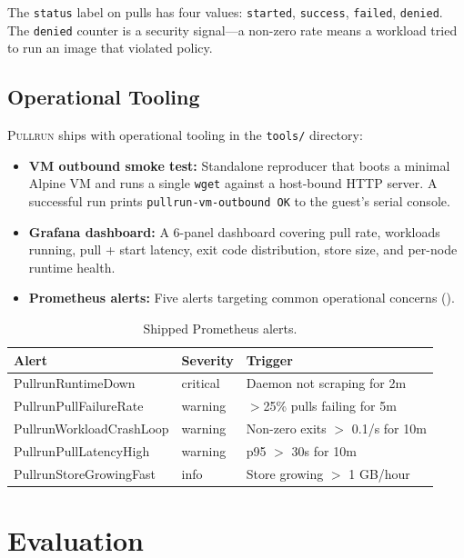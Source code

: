 \documentclass[11pt,a4paper]{article}
\newcommand{\pullrun}{\textsc{Pullrun}}
\begin{document}
The \texttt{status} label on pulls has four values: \texttt{started}, \texttt{success}, \texttt{failed}, \texttt{denied}. The \texttt{denied} counter is a security signal---a non-zero rate means a workload tried to run an image that violated policy.

\subsection{Operational Tooling}

\pullrun{} ships with operational tooling in the \texttt{tools/} directory:

\begin{itemize}[leftmargin=*]
    \item \textbf{VM outbound smoke test:} Standalone reproducer that boots a minimal Alpine VM and runs a single \texttt{wget} against a host-bound HTTP server. A successful run prints \texttt{pullrun-vm-outbound OK} to the guest's serial console.
    \item \textbf{Grafana dashboard:} A 6-panel dashboard covering pull rate, workloads running, pull + start latency, exit code distribution, store size, and per-node runtime health.
    \item \textbf{Prometheus alerts:} Five alerts targeting common operational concerns ().
\end{itemize}

\begin{table}[htbp]
    \centering
    \caption{Shipped Prometheus alerts.}
    \label{tab:alerts}
    \begin{tabular}{@{}llp{6cm}@{}}
        \toprule
        \textbf{Alert} & \textbf{Severity} & \textbf{Trigger} \\
        \midrule
        PullrunRuntimeDown & critical & Daemon not scraping for 2m \\
        PullrunPullFailureRate & warning & $>$25\% pulls failing for 5m \\
        PullrunWorkloadCrashLoop & warning & Non-zero exits $>$ 0.1/s for 10m \\
        PullrunPullLatencyHigh & warning & p95 $>$ 30s for 10m \\
        PullrunStoreGrowingFast & info & Store growing $>$ 1 GB/hour \\
        \bottomrule
    \end{tabular}
\end{table}

\section{Evaluation}\label{sec:evaluation}
\end{document}
